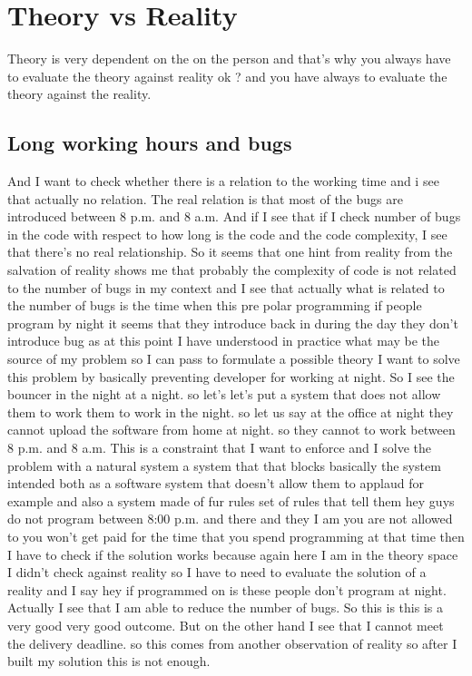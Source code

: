 \documentclass[conference, compsoc, twoside]{IEEEtran}
\begin{document}
\section{Theory vs Reality} %
\label{sec:theory_vs_reality}
Theory is very dependent on the on the person and that's why you always have to evaluate the theory against reality ok ? and you have always to evaluate the theory against the reality.
\subsection{Long working hours and bugs} %
And I want to check whether there is a relation to the working time and i see that actually no relation.
The real relation is that most of the bugs are introduced between 8 p.m. and 8 a.m. 
And if I see that if I check number of bugs in the code with respect to how long is the code and the code complexity, I see that there's no real relationship.
So it seems that one hint from reality from the salvation of reality shows me that probably the complexity of code is not related to the number of bugs in my context and I see that actually what is related to the number of bugs is the time when this pre polar programming if people program by night it seems that they introduce back in during the day they don't introduce bug as at this point I have understood in practice what may be the source of my problem 
so I can pass to formulate a possible theory I want to solve this problem by basically preventing developer for working at night.
So I see the bouncer in the night at a night. 
so let's let's put a system that does not allow them to work them to work in the night.
so let us say at the office at night they cannot upload the software from home at night.
so they cannot to work between 8 p.m. and 8 a.m. 
This is a constraint that I want to enforce and I solve the problem with a natural system a system that that blocks basically the system intended both as a software system that doesn't allow them to applaud 
for example and also a system made of fur rules set of rules that tell them hey guys do not program between 8:00 p.m. and there and they I am you are not allowed to you won't get paid for the time that you spend programming at that time then I have to check if the solution works because again here I am in the theory space I didn't check against reality 
so I have to need to evaluate the solution of a reality and I say hey if programmed on is these people don't program at night. 
Actually I see that I am able to reduce the number of bugs. 
 So this is this is a very good very good outcome. But on the other hand I see that I cannot meet the delivery deadline. so this comes from another observation of reality so after I built my solution this is not enough.
\end{document}

